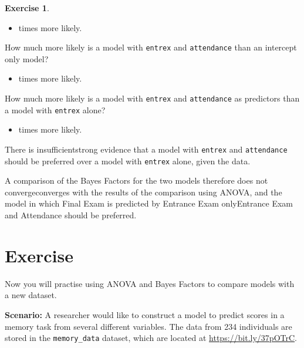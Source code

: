 \documentclass[
]{book}
\providecommand{\tightlist}{%
  \setlength{\itemsep}{0pt}\setlength{\parskip}{0pt}}
\theoremstyle{definition}
\theoremstyle{definition}
\theoremstyle{definition}
\newtheorem{exercise}{Exercise}[chapter]
\theoremstyle{definition}
\theoremstyle{remark}
\begin{document}
\begin{exercise}
\begin{itemize}
\tightlist
\item
  times more likely.
\end{itemize}

How much more likely is a model with \texttt{entrex} and \texttt{attendance} than an intercept only model?

\begin{itemize}
\tightlist
\item
  times more likely.
\end{itemize}

How much more likely is a model with \texttt{entrex} and \texttt{attendance} as predictors than a model with \texttt{entrex} alone?

\begin{itemize}
\tightlist
\item
  times more likely.
\end{itemize}

There is insufficientstrong evidence that a model with \texttt{entrex} and \texttt{attendance} should be preferred over a model with \texttt{entrex} alone, given the data.

A comparison of the Bayes Factors for the two models therefore does not convergeconverges with the results of the comparison using ANOVA, and the model in which Final Exam is predicted by Entrance Exam onlyEntrance Exam and Attendance should be preferred.
\end{exercise}

\hypertarget{exercise}{%
\section{Exercise}\label{exercise}}

Now you will practise using ANOVA and Bayes Factors to compare models with a new dataset.

\hfill\break
\textbf{Scenario:} A researcher would like to construct a model to predict scores in a memory task from several different variables. The data from 234 individuals are stored in the \texttt{memory\_data} dataset, which are located at \url{https://bit.ly/37pOTrC}.
\end{document}
